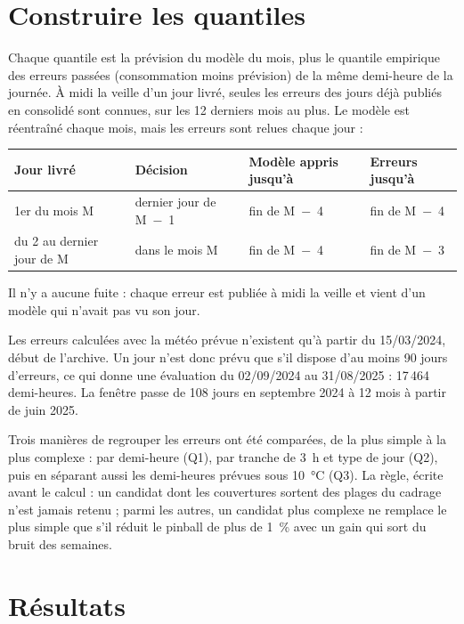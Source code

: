 \documentclass[11pt,a4paper]{article}
\begin{document}
\section{Construire les quantiles}

Chaque quantile est la prévision du modèle du mois, plus le quantile empirique des erreurs passées (consommation moins prévision) de la même demi-heure de la journée. À midi la veille d'un jour livré, seules les erreurs des jours déjà publiés en consolidé sont connues, sur les 12 derniers mois au plus. Le modèle est réentraîné chaque mois, mais les erreurs sont relues chaque jour :

\begin{table}[H]
\small
\begin{tabularx}{\linewidth}{YYll}
\toprule
\textbf{Jour livré} & \textbf{Décision} & \textbf{Modèle appris jusqu'à} & \textbf{Erreurs jusqu'à} \\
\midrule
1er du mois M & dernier jour de M~$-$~1 & fin de M~$-$~4 & fin de M~$-$~4 \\
du 2 au dernier jour de M & dans le mois M & fin de M~$-$~4 & fin de M~$-$~3 \\
\bottomrule
\end{tabularx}
\end{table}

Il n'y a aucune fuite : chaque erreur est publiée à midi la veille et vient d'un modèle qui n'avait pas vu son jour.

Les erreurs calculées avec la météo prévue n'existent qu'à partir du 15/03/2024, début de l'archive. Un jour n'est donc prévu que s'il dispose d'au moins 90 jours d'erreurs, ce qui donne une évaluation du 02/09/2024 au 31/08/2025 : 17\,464 demi-heures. La fenêtre passe de 108 jours en septembre 2024 à 12 mois à partir de juin 2025.

Trois manières de regrouper les erreurs ont été comparées, de la plus simple à la plus complexe : par demi-heure (Q1), par tranche de 3~h et type de jour (Q2), puis en séparant aussi les demi-heures prévues sous 10~°C (Q3). La règle, écrite avant le calcul : un candidat dont les couvertures sortent des plages du cadrage n'est jamais retenu ; parmi les autres, un candidat plus complexe ne remplace le plus simple que s'il réduit le pinball de plus de 1~\% avec un gain qui sort du bruit des semaines.

\section{Résultats}
\end{document}
